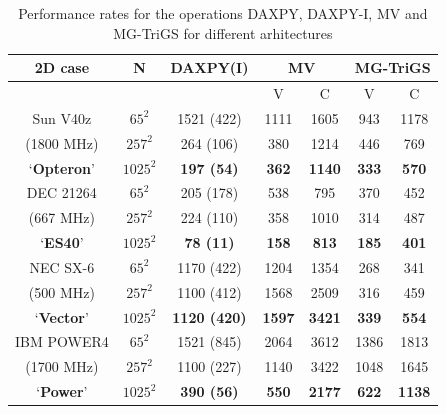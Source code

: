 \begin{table}[!h]
\begin{center}
\begin{tabular}{|c|c|c|c|c|c|c|} \hline
2D case     & N  &{DAXPY(I)}&  \multicolumn{2}{c|}{MV} & \multicolumn{2}{c|}{MG-TriGS} \\ \hline
   &  & & V & C &  V & C \\ \hline
%
{Sun V40z     }    & $65^2$     & 1521 (422)    & 1111     &  1605    & 943      & 1178      \\
{(1800 MHz)     } & $257^2$     &  264 (106)     & 380     &  1214    & 446      & 769      \\
{`{\bf Opteron}'  } &{\bf $1025^2$}&{\bf  197 (54)}&{\bf 362}&{\bf 1140}&{\bf 333} &{\bf 570} \\ \hline

{DEC 21264     } & $65^2$     & 205 (178)    & 538     &  795    & 370      & 452      \\
{(667 MHz)     } & $257^2$     &  224 (110)     & 358     &  1010    & 314      & 487      \\
{`{\bf ES40}'  } &{\bf $1025^2$}&{\bf  78 (11)}&{\bf 158}&{\bf 813}&{\bf 185} &{\bf 401} \\ \hline


{NEC SX-6}   & $65^2$     & 1170 (422)    &1204     &  1354    & 268      & 341      \\
{(500 MHz)} & $257^2$   & 1100 (412)    &1568     &  2509    & 316      & 459      \\
{ `{\bf Vector}'   } &{\bf $1025^2$}&{\bf  1120 (420)}&{\bf 1597}&{\bf 3421}&{\bf 339} &{\bf 554} \\ \hline


{IBM POWER4}           & $65^2$   &1521 (845)    &  2064     &  3612    &  1386     &  1813     \\
{(1700 MHz)     }      & $257^2$   &1100 (227)   &  1140     &  3422    &  1048     &  1645     \\
{`{\bf Power}'}        &{\bf $1025^2$} &{\bf  390 (56)}&{\bf  550}&{\bf 2177}&{\bf  622}&{\bf  1138}\\ \hline
%
\end{tabular}
\end{center}
\caption{Performance rates for the operations DAXPY, DAXPY-I, MV and MG-TriGS for different arhitectures}
\label{sbblasresults1}
\end{table}


